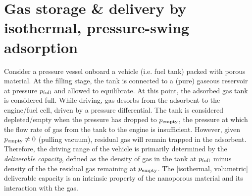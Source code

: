 \section{Gas storage \& delivery by isothermal, pressure-swing adsorption}
Consider a pressure vessel onboard a vehicle (i.e. fuel tank) packed with porous material. At the filling stage, the tank is connected to a (pure) gaseous reservoir at pressure $p_{\text{full}}$ and allowed to equilibrate. At this point, the adsorbed gas tank is considered full. While driving, gas desorbs from the adsorbent to the engine/fuel cell, driven by a pressure differential.
The tank is considered depleted/empty when the pressure has dropped to $p_{\text{empty}}$, the pressure at which the flow rate of gas from the tank to the engine is insufficient.
%
However, given $p_{\text{empty}} \neq 0$ (pulling vacuum), residual gas will remain trapped in the adsorbent. Therefore, the driving range of the vehicle is primarily determined by the \emph{deliverable capacity}, defined as the density of gas in the tank at $p_{\text{full}}$ minus density of the the residual gas remaining at $p_{\text{empty}}$. The [isothermal, volumetric] deliverable capacity is an intrinsic property of the nanoporous material and its interaction with the gas.


